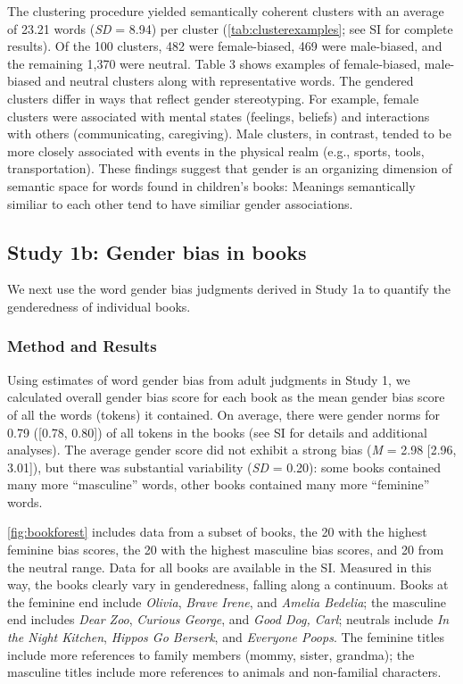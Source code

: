 \documentclass[
  english,
  ,man,floatsintext]{apa6}
\begin{document}
The clustering procedure yielded semantically coherent clusters with an average of 23.21 words (\emph{SD} = 8.94) per cluster (\autoref{tab:clusterexamples}; see SI for complete results). Of the 100 clusters, 482 were female-biased, 469 were male-biased, and the remaining 1,370 were neutral. Table 3 shows examples of female-biased, male-biased and neutral clusters along with representative words. The gendered clusters differ in ways that reflect gender stereotyping. For example, female clusters were associated with mental states (feelings, beliefs) and interactions with others (communicating, caregiving). Male clusters, in contrast, tended to be more closely associated with events in the physical realm (e.g., sports, tools, transportation). These findings suggest that gender is an organizing dimension of semantic space for words found in children's books: Meanings semantically similiar to each other tend to have similiar gender associations.

\hypertarget{study-1b-gender-bias-in-books}{%
\subsection{Study 1b: Gender bias in books}\label{study-1b-gender-bias-in-books}}

We next use the word gender bias judgments derived in Study 1a to quantify the genderedness of individual books.

\hypertarget{method-and-results}{%
\subsubsection{Method and Results}\label{method-and-results}}

Using estimates of word gender bias from adult judgments in Study 1, we calculated overall gender bias score for each book as the mean gender bias score of all the words (tokens) it contained. On average, there were gender norms for 0.79 ({[}0.78, 0.80{]}) of all tokens in the books (see SI for details and additional analyses). The average gender score did not exhibit a strong bias (\emph{M} = 2.98 {[}2.96, 3.01{]}), but there was substantial variability (\emph{SD} = 0.20): some books contained many more \enquote{masculine} words, other books contained many more \enquote{feminine} words.

\autoref{fig:bookforest} includes data from a subset of books, the 20 with the highest feminine bias scores, the 20 with the highest masculine bias scores, and 20 from the neutral range. Data for all books are available in the SI. Measured in this way, the books clearly vary in genderedness, falling along a continuum. Books at the feminine end include \emph{Olivia}, \emph{Brave Irene}, and \emph{Amelia Bedelia}; the masculine end includes \emph{Dear Zoo}, \emph{Curious George}, and \emph{Good Dog, Carl}; neutrals include \emph{In the Night Kitchen}, \emph{Hippos Go Berserk}, and \emph{Everyone Poops}. The feminine titles include more references to family members (mommy, sister, grandma); the masculine titles include more references to animals and non-familial characters.
\end{document}
